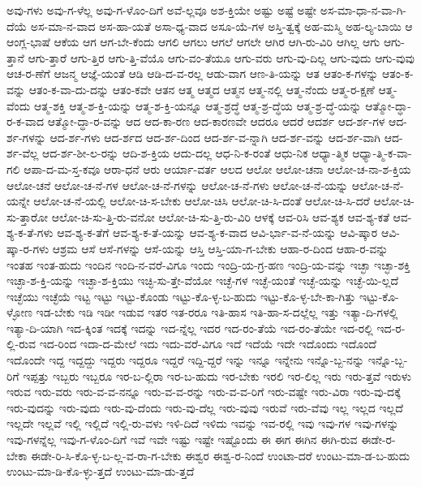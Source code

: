 {ಅವು-ಗಳು
ಅವು-ಗ-ಳೆಲ್ಲ
ಅವು-ಗ-ಳೊಂ-ದಿಗೆ
ಅವೆ-ಲ್ಲವೂ
ಅಶ-ಕ್ತಿಯೇ
ಅಷ್ಟು
ಅಷ್ಟೆ
ಅಷ್ಟೇ
ಅಸ-ಮಾ-ಧಾ-ನ-ವಾ-ಗಿ-ದೆಯೆ
ಅಸ-ಮಾ-ನ-ವಾದ
ಅಸ-ಹಾ-ಯತೆ
ಅಸಾ-ಧ್ಯ-ವಾದ
ಅಸೂ-ಯೆ-ಗಳ
ಅಸ್ತಿ-ತ್ವಕ್ಕೆ
ಅಹ-ಮಸ್ಮಿ
ಅಹ-ಲ್ಯ-ಬಾಯಿ
ಆ
ಆಂಗ್ಲ-ಭಾಷೆ
ಆಕೆಯ
ಆಗ
ಆಗ-ಬೇ-ಕೆಂದು
ಆಗಲಿ
ಆಗಲು
ಆಗಲೆ
ಆಗಲೇ
ಆಗಿರ
ಆಗಿ-ರು-ವಿರಿ
ಆಗಿಲ್ಲ
ಆಗು
ಆಗು-ತ್ತಾನೆ
ಆಗು-ತ್ತಾರೆ
ಆಗು-ತ್ತಿರ
ಆಗು-ತ್ತಿ-ವೆಯೊ
ಆಗು-ವಂ-ತೆಯೂ
ಆಗು-ವರು
ಆಗು-ವು-ದಿಲ್ಲ
ಆಗು-ವುದು
ಆಗು-ವುವು
ಆಚ-ರ-ಣೆಗೆ
ಆಜನ್ಮ
ಆಜ್ಞೆ-ಯಂತೆ
ಆಡಿ
ಆಡಿ-ದ-ವ-ರಲ್ಲ
ಆಡು-ವಾಗ
ಆಣ-ತಿ-ಯನ್ನು
ಆತ
ಆತಂ-ಕ-ಗಳನ್ನು
ಆತಂ-ಕ-ವನ್ನು
ಆತಂ-ಕ-ವಾ-ದು-ದನ್ನು
ಆತಂ-ಕವೇ
ಆತನ
ಆತ್ಮ
ಆತ್ಮದ
ಆತ್ಮನ
ಆತ್ಮ-ನಲ್ಲಿ
ಆತ್ಮ-ನೆಂದು
ಆತ್ಮ-ರ-ಕ್ಷಣೆ
ಆತ್ಮ-ವೆಂದು
ಆತ್ಮ-ಶಕ್ತಿ
ಆತ್ಮ-ಶ-ಕ್ತಿ-ಯನ್ನು
ಆತ್ಮ-ಶ-ಕ್ತಿ-ಯನ್ನೂ
ಆತ್ಮ-ಶ್ರದ್ಧೆ
ಆತ್ಮ-ಶ್ರ-ದ್ಧೆಯ
ಆತ್ಮ-ಶ್ರ-ದ್ಧೆ-ಯನ್ನು
ಆತ್ಮೋ-ದ್ಧಾ-ರ-ಕ-ವಾದ
ಆತ್ಮೋ-ದ್ಧಾ-ರ-ವನ್ನು
ಆದ
ಆದ-ಕಾ-ರಣ
ಆದ-ಕಾರಣವೇ
ಆದರೂ
ಆದರೆ
ಆದರ್ಶ
ಆದ-ರ್ಶ-ಗಳ
ಆದ-ರ್ಶ-ಗಳನ್ನು
ಆದ-ರ್ಶ-ಗಳು
ಆದ-ರ್ಶದ
ಆದ-ರ್ಶ-ದಿಂದ
ಆದ-ರ್ಶ-ವ-ನ್ನಾಗಿ
ಆದ-ರ್ಶ-ವನ್ನು
ಆದ-ರ್ಶ-ವಾಗಿ
ಆದ-ರ್ಶ-ವೆಲ್ಲ
ಆದ-ರ್ಶ-ಶೀ-ಲ-ರನ್ನು
ಆದಿ-ಶ-ಕ್ತಿಯ
ಆದು-ದಲ್ಲ
ಆಧ-ನಿ-ಕ-ರಂತೆ
ಆಧು-ನಿಕ
ಆಧ್ಯಾ-ತ್ಮಿಕ
ಆಧ್ಯಾ-ತ್ಮಿ-ಕ-ವಾ-ಗಲಿ
ಆಪಾ-ದ-ಮ-ಸ್ತ-ಕವೂ
ಆರಾ-ಧನೆ
ಆರು
ಆರ್ಯಾ-ವರ್ತ
ಆಲದ
ಆಲೋ
ಆಲೋ-ಚನಾ
ಆಲೋ-ಚ-ನಾ-ಶ-ಕ್ತಿಯ
ಆಲೋ-ಚನೆ
ಆಲೋ-ಚ-ನೆ-ಗಳ
ಆಲೋ-ಚ-ನೆ-ಗಳನ್ನು
ಆಲೋ-ಚ-ನೆ-ಗಳು
ಆಲೋ-ಚ-ನೆ-ಯನ್ನು
ಆಲೋ-ಚ-ನೆ-ಯನ್ನೇ
ಆಲೋ-ಚ-ನೆ-ಯಲ್ಲಿ
ಆಲೋ-ಚಿ-ಸ-ಬೇಕು
ಆಲೋ-ಚಿಸಿ
ಆಲೋ-ಚಿ-ಸಿ-ದಂತೆ
ಆಲೋ-ಚಿ-ಸಿ-ದರೆ
ಆಲೋ-ಚಿ-ಸು-ತ್ತಾರೋ
ಆಲೋ-ಚಿ-ಸು-ತ್ತಿ-ರು-ವನೋ
ಆಲೋ-ಚಿ-ಸು-ತ್ತಿ-ರು-ವಿರಿ
ಆಳಕ್ಕೆ
ಆವ-ರಿಸಿ
ಆವ-ಶ್ಯಕ
ಆವ-ಶ್ಯ-ಕತೆ
ಆವ-ಶ್ಯ-ಕ-ತೆ-ಗಳು
ಆವ-ಶ್ಯ-ಕ-ತೆಗೆ
ಆವ-ಶ್ಯ-ಕ-ತೆ-ಯನ್ನು
ಆವ-ಶ್ಯ-ಕ-ವಾದ
ಆವಿ-ರ್ಭಾ-ವ-ನೆ-ಯನ್ನು
ಆವಿ-ಷ್ಕಾರ
ಆವಿ-ಷ್ಕಾ-ರ-ಗಳು
ಆಶ್ರಮ
ಆಸೆ
ಆಸೆ-ಗಳನ್ನು
ಆಸೆ-ಯನ್ನು
ಆಸ್ತಿ
ಆಸ್ತಿ-ಯಾ-ಗ-ಬೇಕು
ಆಹಾ-ರ-ದಿಂದ
ಆಹಾ-ರ-ವನ್ನು
ಇಂತಹ
ಇಂತ-ಹುದು
ಇಂದಿನ
ಇಂದಿ-ನ-ವರೆ-ವಿಗೂ
ಇಂದು
ಇಂದ್ರಿ-ಯ-ಗ್ರ-ಹಣ
ಇಂದ್ರಿ-ಯ-ವನ್ನು
ಇಚ್ಛಾ
ಇಚ್ಛಾ-ಶಕ್ತಿ
ಇಚ್ಛಾ-ಶ-ಕ್ತಿ-ಯನ್ನು
ಇಚ್ಛಾ-ಶ-ಕ್ತಿಯು
ಇಚ್ಛಿ-ಸು-ತ್ತೇ-ವೆಯೋ
ಇಚ್ಛೆ-ಗಳ
ಇಚ್ಛೆ-ಯಂತೆ
ಇಚ್ಛೆ-ಯನ್ನು
ಇಚ್ಛೆ-ಯಿ-ಲ್ಲದೆ
ಇಚ್ಛೆಯು
ಇಚ್ಛೆಯೆ
ಇಟ್ಟ
ಇಟ್ಟು
ಇಟ್ಟು-ಕೊಂಡು
ಇಟ್ಟು-ಕೊ-ಳ್ಳ-ಬ-ಹುದು
ಇಟ್ಟು-ಕೊ-ಳ್ಳ-ಬೇ-ಕಾ-ಗಿತ್ತು
ಇಟ್ಟು-ಕೊ-ಳ್ಳೋಣ
ಇಡ-ಬೇಕು
ಇಡಿ
ಇಡೀ
ಇಡುವ
ಇತರ
ಇತ-ರರೂ
ಇತಿ-ಹಾಸ
ಇತಿ-ಹಾ-ಸ-ದಲ್ಲೆಲ್ಲ
ಇತ್ತು
ಇತ್ಯಾ-ದಿ-ಗಳಲ್ಲಿ
ಇತ್ಯಾ-ದಿ-ಯಾಗಿ
ಇದ-ಕ್ಕಿಂತ
ಇದಕ್ಕೆ
ಇದನ್ನು
ಇದ-ನ್ನೆಲ್ಲ
ಇದರ
ಇದ-ರಂ-ತೆಯೆ
ಇದ-ರಂ-ತೆಯೇ
ಇದ-ರಲ್ಲಿ
ಇದ-ರ-ಲ್ಲಿ-ರುವ
ಇದ-ರಿಂದ
ಇದಾ-ದ-ಮೇಲೆ
ಇದು
ಇದು-ವರೆ-ವಿಗೂ
ಇದೆ
ಇದೆಯೆ
ಇದೇ
ಇದೊಂದು
ಇದೊಂದೆ
ಇದೊಂದೇ
ಇದ್ದ
ಇದ್ದದ್ದು
ಇದ್ದರು
ಇದ್ದರೂ
ಇದ್ದರೆ
ಇದ್ದಿ-ದ್ದರೆ
ಇನ್ನು
ಇನ್ನೂ
ಇನ್ನೇನು
ಇನ್ನೊ-ಬ್ಬ-ನನ್ನು
ಇನ್ನೊ-ಬ್ಬ-ರಿಗೆ
ಇಪ್ಪತ್ತು
ಇಬ್ಬರು
ಇಬ್ಬರೂ
ಇರ-ಬ-ಲ್ಲಿರಾ
ಇರ-ಬ-ಹುದು
ಇರ-ಬೇಕು
ಇರಲಿ
ಇರ-ಲಿಲ್ಲ
ಇರು
ಇರು-ತ್ತವೆ
ಇರುಳು
ಇರುವ
ಇರು-ವರು
ಇರು-ವ-ವ-ನನ್ನೂ
ಇರು-ವ-ವ-ರನ್ನು
ಇರು-ವ-ವ-ರಿಗೆ
ಇರು-ವಷ್ಟೇ
ಇರು-ವಿರಾ
ಇರು-ವು-ದಕ್ಕೆ
ಇರು-ವುದನ್ನು
ಇರು-ವುದು
ಇರು-ವು-ದೆಂದು
ಇರು-ವು-ದೆಲ್ಲ
ಇರು-ವುವು
ಇರುವೆ
ಇರು-ವೆವು
ಇಲ್ಲ
ಇಲ್ಲದ
ಇಲ್ಲದೆ
ಇಲ್ಲದೇ
ಇಲ್ಲವೆ
ಇಲ್ಲಿ
ಇಲ್ಲಿದೆ
ಇಲ್ಲಿ-ರು-ವಳು
ಇಳಿ-ದಿದೆ
ಇಳಿದು
ಇವನ್ನು
ಇವ-ರಲ್ಲಿ
ಇವು
ಇವು-ಗಳ
ಇವು-ಗಳನ್ನು
ಇವು-ಗಳನ್ನೆಲ್ಲ
ಇವು-ಗ-ಳೊಂ-ದಿಗೆ
ಇವೆ
ಇವೇ
ಇಷ್ಟು
ಇಷ್ಟೇ
ಇಷ್ಟೊಂದು
ಈ
ಈಗ
ಈಗಿನ
ಈಗಿ-ರುವ
ಈಡೇ-ರ-ಬೇಕಾ
ಈಡೇ-ರಿ-ಸಿ-ಕೊ-ಳ್ಳ-ಬ-ಲ್ಲ-ವ-ರಾ-ಗ-ಬೇಕು
ಈಶ್ವರ
ಈಶ್ವ-ರ-ನಿಂದೆ
ಉಂಟಾ-ದರೆ
ಉಂಟು-ಮಾ-ಡ-ಬ-ಹುದು
ಉಂಟು-ಮಾ-ಡಿ-ಕೊ-ಳ್ಳು-ತ್ತದೆ
ಉಂಟು-ಮಾ-ಡು-ತ್ತದೆ
}
